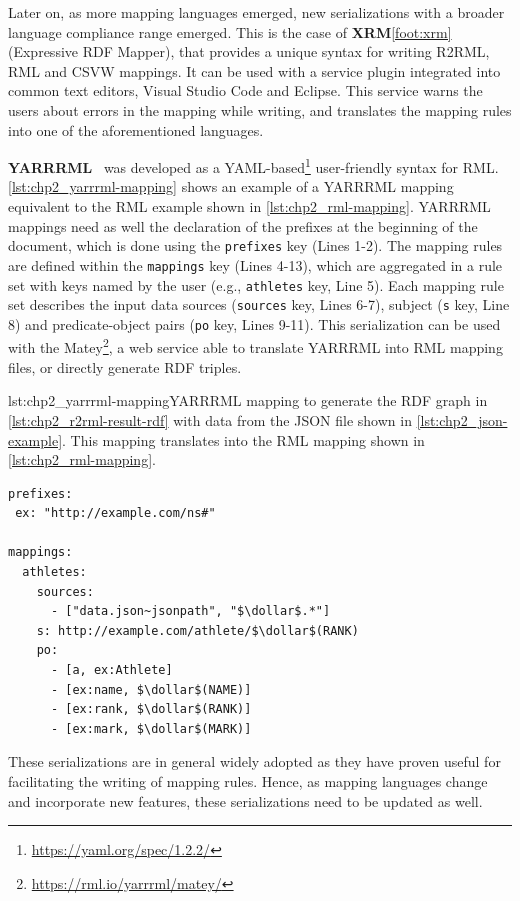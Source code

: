 Later on, as more mapping languages emerged, new serializations with a broader language compliance range emerged. This is the case of \textbf{XRM}\cref{foot:xrm} (Expressive RDF Mapper), that provides a unique syntax for writing R2RML, RML and CSVW mappings. It can be used with a service plugin integrated into common text editors, Visual Studio Code and Eclipse. This service warns the users about errors in the mapping while writing, and translates the mapping rules into one of the aforementioned languages. 

\textbf{YARRRML}~\parencite{Heyvaert2018yarrrml} was developed as a YAML-based\footnote{\url{https://yaml.org/spec/1.2.2/}} user-friendly syntax for RML. 
\cref{lst:chp2_yarrrml-mapping} shows an example of a YARRRML mapping equivalent to the RML example shown in \cref{lst:chp2_rml-mapping}. 
YARRRML mappings need as well the declaration of the prefixes at the beginning of the document, which is done using the \texttt{prefixes} key (Lines 1-2). The mapping rules are defined within the \texttt{mappings} key (Lines 4-13), which are aggregated in a rule set with keys named by the user (e.g., \texttt{athletes} key, Line 5). Each mapping rule set describes the input data sources (\texttt{sources} key, Lines 6-7), subject (\texttt{s} key, Line 8) and predicate-object pairs (\texttt{po} key, Lines 9-11).
This serialization can be used with the Matey\footnote{\url{https://rml.io/yarrrml/matey/}}, a web service able to translate YARRRML into RML mapping files, or directly generate RDF triples. 

\begin{captionedlisting}{lst:chp2_yarrrml-mapping}{YARRRML mapping to generate the RDF graph in \cref{lst:chp2_r2rml-result-rdf} with data from the JSON file shown in \cref{lst:chp2_json-example}. This mapping translates into the RML mapping shown in \cref{lst:chp2_rml-mapping}.}
\centering
{\begin{lstlisting}[language=yarrrml]
prefixes:
 ex: "http://example.com/ns#"

mappings:
  athletes:
    sources:
      - ["data.json~jsonpath", "$\dollar$.*"]
    s: http://example.com/athlete/$\dollar$(RANK)
    po:
      - [a, ex:Athlete]
      - [ex:name, $\dollar$(NAME)]
      - [ex:rank, $\dollar$(RANK)]
      - [ex:mark, $\dollar$(MARK)]
\end{lstlisting}}
\end{captionedlisting}

These serializations are in general widely adopted as they have proven useful for facilitating the writing of mapping rules. Hence, as mapping languages change and incorporate new features, these serializations need to be updated as well.